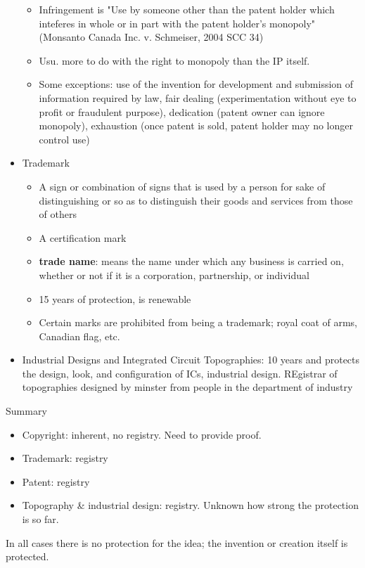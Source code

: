 \documentclass[10pt]{article}
\begin{document}
\begin{itemize}
\begin{itemize}
	\item Infringement is "Use by someone other than the patent holder which inteferes in whole or in part with the patent holder's monopoly" (Monsanto Canada Inc. v. Schmeiser, 2004 SCC 34)
	\item Usu. more to do with the right to monopoly than the IP itself.
	\item Some exceptions: use of the invention for development and submission of information required by law, fair dealing (experimentation without eye to profit or fraudulent purpose), dedication (patent owner can ignore monopoly), exhaustion (once patent is sold, patent holder may no longer control use)
\end{itemize}
\item Trademark
\begin{itemize}
	\item A sign or combination of signs that is used by a person for sake of distinguishing or so as to distinguish their goods and services from those of others
	\item A certification mark
	\item \textbf{trade name}: means the name under which any business is carried on, whether or not if it is a corporation, partnership, or individual
	\item 15 years of protection, is renewable
	\item Certain marks are prohibited from being a trademark; royal coat of arms, Canadian flag, etc.

\end{itemize}
\item Industrial Designs and Integrated Circuit Topographies: 10 years and protects the design, look, and configuration of ICs, industrial design. REgistrar of topographies designed by minster from people in the department of industry

\end{itemize}

Summary
\begin{itemize}
	\item Copyright: inherent, no registry. Need to provide proof.
	\item Trademark: registry
	\item Patent: registry
	\item Topography \& industrial design: registry. Unknown how strong the protection is so far.
\end{itemize}

In all cases there is no protection for the idea; the invention or creation itself is protected.
\end{document}
